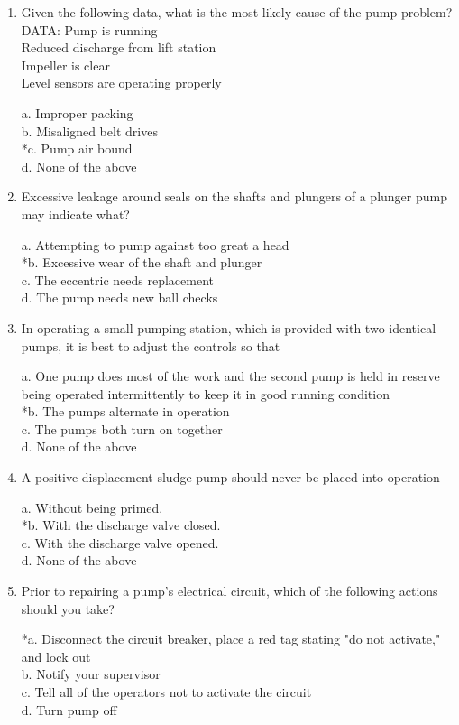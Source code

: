 \begin{enumerate}[1.]
\item  Given the following data, what is the most likely cause of the pump problem?\\
DATA: Pump is running\\
Reduced discharge from lift station\\
Impeller is clear\\
Level sensors are operating properly 

a. Improper packing \\
b. Misaligned belt drives \\
*c. Pump air bound \\
d. None of the above 


\item  Excessive leakage around seals on the shafts and plungers of a plunger pump may indicate what? 

a. Attempting to pump against too great a head \\
*b. Excessive wear of the shaft and plunger \\
c. The eccentric needs replacement \\
d. The pump needs new ball checks 


\item  In operating a small pumping station, which is provided with two identical pumps, it is best to adjust the controls so that 

a. One pump does most of the work and the second pump is held in reserve being operated intermittently to keep it in good running condition \\
*b. The pumps alternate in operation \\
c. The pumps both turn on together \\
d. None of the above 


\item  A positive displacement sludge pump should never be placed into operation 

a. Without being primed. \\
*b. With the discharge valve closed. \\
c. With the discharge valve opened. \\
d. None of the above 


\item  Prior to repairing a pump's electrical circuit, which of the following actions should you take? 

*a. Disconnect the circuit breaker, place a red tag stating "do not activate," and lock out \\
b. Notify your supervisor \\
c. Tell all of the operators not to activate the circuit \\
d. Turn pump off 



\end{enumerate}
